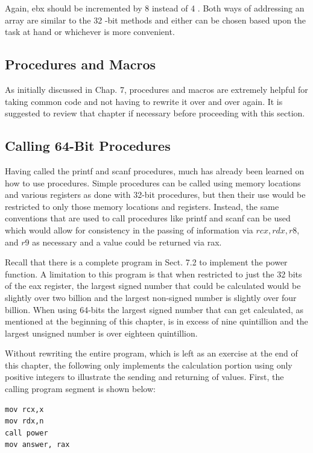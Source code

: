 \documentclass[10pt]{book}
\begin{document}
Again, ebx should be incremented by 8 instead of 4 . Both ways of addressing an array are similar to the 32 -bit methods and either can be chosen based upon the task at hand or whichever is more convenient.

\subsection{Procedures and Macros}
As initially discussed in Chap. 7, procedures and macros are extremely helpful for taking common code and not having to rewrite it over and over again. It is suggested to review that chapter if necessary before proceeding with this section.

\subsection{Calling 64-Bit Procedures}
Having called the printf and scanf procedures, much has already been learned on how to use procedures. Simple procedures can be called using memory locations and various registers as done with 32-bit procedures, but then their use would be restricted to only those memory locations and registers. Instead, the same conventions that are used to call procedures like printf and scanf can be used which would allow for consistency in the passing of information via $r c x, r d x, r 8$, and $r 9$ as necessary and a value could be returned via rax.


Recall that there is a complete program in Sect. 7.2 to implement the power function. A limitation to this program is that when restricted to just the 32 bits of the eax register, the largest signed number that could be calculated would be slightly over two billion and the largest non-signed number is slightly over four billion. When using 64-bits the largest signed number that can get calculated, as mentioned at the beginning of this chapter, is in excess of nine quintillion and the largest unsigned number is over eighteen quintillion.

Without rewriting the entire program, which is left as an exercise at the end of this chapter, the following only implements the calculation portion using only positive integers to illustrate the sending and returning of values. First, the calling program segment is shown below:

\begin{verbatim}
mov rcx,x
mov rdx,n
call power
mov answer, rax
\end{verbatim}
\end{document}
